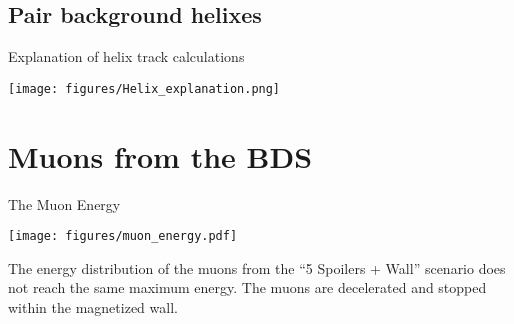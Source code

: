 \documentclass[xcolor={dvipsnames}]{beamer}
\begin{document}
\subsection{Pair background helixes}
\begin{frame}{Explanation of helix track calculations}
 \begin{center}
  \texttt{[image: figures/Helix\_explanation.png]}
\end{center}
\end{frame}

\section{Muons from the BDS}
\begin{frame}{The Muon Energy}
\begin{center}
  \texttt{[image: figures/muon\_energy.pdf]}
\end{center}
The energy distribution of the muons from the ``5 Spoilers + Wall'' scenario does not reach the same maximum energy. The muons are decelerated and stopped within the magnetized wall.
\end{frame}
\end{document}
